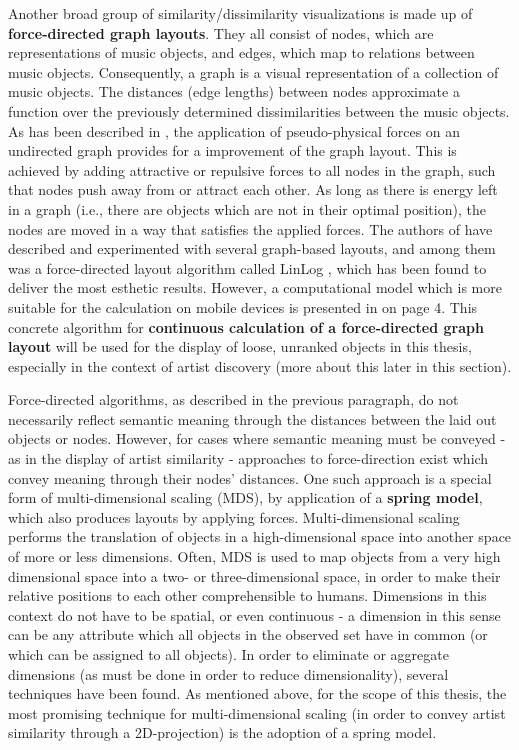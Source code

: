 Another broad group of similarity/dissimilarity visualizations is made up of \textbf{force-directed graph layouts}. They all consist of nodes, which are representations of music objects, and edges, which map to relations between music objects. Consequently, a graph is a visual representation of a collection of music objects. The distances (edge lengths) between nodes approximate a function over the previously determined dissimilarities between the music objects. As has been described in \cite{gansner:1998}, the application of pseudo-physical forces on an undirected graph provides for a improvement of the graph layout. This is achieved by adding attractive or repulsive forces to all nodes in the graph, such that nodes push away from or attract each other. As long as there is energy left in a graph (i.e., there are objects which are not in their optimal position), the nodes are moved in a way that satisfies the applied forces. The authors of \cite{Muelder:2010fk} have described and experimented with several graph-based layouts, and among them was a force-directed layout algorithm called LinLog \cite{noack:2003}, which has been found to deliver the most esthetic results. However, a computational model which is more suitable for the calculation on mobile devices is presented in \cite{Kobourov04} on page 4. This concrete algorithm for \textbf{continuous calculation of a force-directed graph layout} will be used for the display of loose, unranked objects in this thesis, especially in the context of artist discovery (more about this later in this section).

Force-directed algorithms, as described in the previous paragraph, do not necessarily reflect semantic meaning through the distances between the laid out objects or nodes. However, for cases where semantic meaning must be conveyed - as in the display of artist similarity - approaches to force-direction exist which convey meaning through their nodes' distances. One such approach is a special form of multi-dimensional scaling (MDS), by application of a \textbf{spring model}, which also produces layouts by applying forces.
Multi-dimensional scaling performs the translation of objects in a high-dimensional space into another space of more or less dimensions. Often, MDS is used to map objects from a very high dimensional space into a two- or three-dimensional space, in order to make their relative positions to each other comprehensible to humans. Dimensions in this context do not have to be spatial, or even continuous - a dimension in this sense can be any attribute which all objects in the observed set have in common (or which can be assigned to all objects). In order to eliminate or aggregate dimensions (as must be done in order to reduce dimensionality), several techniques have been found. As mentioned above, for the scope of this thesis, the most promising technique for multi-dimensional scaling (in order to convey artist similarity through a 2D-projection) is the adoption of a spring model.

